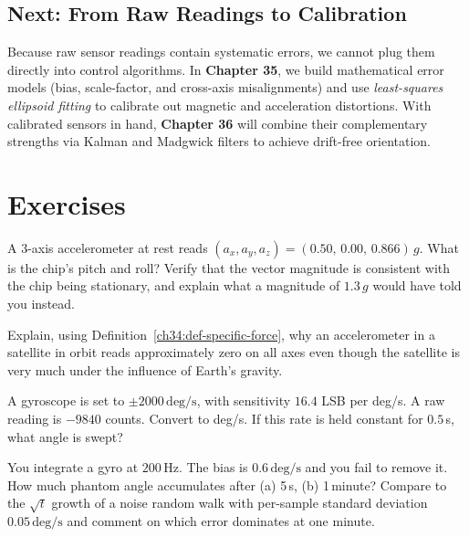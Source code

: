 \subsection{Next: From Raw Readings to Calibration}
Because raw sensor readings contain systematic errors, we cannot plug them directly into control algorithms. In \textbf{Chapter 35}, we build mathematical error models (bias, scale-factor, and cross-axis misalignments) and use \emph{least-squares ellipsoid fitting} to calibrate out magnetic and acceleration distortions. With calibrated sensors in hand, \textbf{Chapter 36} will combine their complementary strengths via Kalman and Madgwick filters to achieve drift-free orientation.

\section{Exercises}
\label{ch34:exercises}

\begin{exercise}
A 3-axis accelerometer at rest reads $(a_x,a_y,a_z)=(0.50,\,0.00,\,0.866)\,g$. What is
the chip's pitch and roll? Verify that the vector magnitude is consistent with the chip
being stationary, and explain what a magnitude of $1.3\,g$ would have told you instead.
\end{exercise}

\begin{exercise}
Explain, using Definition~\ref{ch34:def-specific-force}, why an accelerometer in a
satellite in orbit reads approximately zero on all axes even though the satellite is
very much under the influence of Earth's gravity.
\end{exercise}

\begin{exercise}
A gyroscope is set to $\pm2000\,\mathrm{deg/s}$, with sensitivity $16.4$ LSB per
deg/s. A raw reading is $-9840$ counts. Convert to deg/s. If this rate is held constant
for $0.5\,$s, what angle is swept?
\end{exercise}

\begin{exercise}
You integrate a gyro at $200\,\mathrm{Hz}$. The bias is $0.6\,\mathrm{deg/s}$ and you
fail to remove it. How much phantom angle accumulates after (a) 5\,s, (b) 1\,minute?
Compare to the $\sqrt{t}$ growth of a noise random walk with per-sample standard
deviation $0.05\,\mathrm{deg/s}$ and comment on which error dominates at one minute.
\end{exercise}


